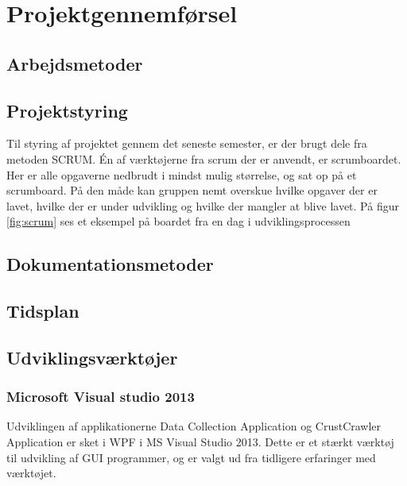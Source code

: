 \thispagestyle{fancy}
\chapter{Projektgennemførsel}
\label{chp:projektgennemforsel}

\section{Arbejdsmetoder}
\label{sec:arbejdsmetoder}

\section{Projektstyring}
\label{sec:projektstyring}

Til styring af projektet gennem det seneste semester, er der brugt dele fra metoden SCRUM.
Én af værktøjerne fra scrum der er anvendt, er scrumboardet. Her er alle opgaverne nedbrudt i mindst mulig størrelse, og sat op på et scrumboard. På den måde kan gruppen nemt overskue hvilke opgaver der er lavet, hvilke der er under udvikling og hvilke der mangler at blive lavet. På figur \ref{fig:scrum} ses et eksempel på boardet fra en dag i udviklingsprocessen



\section{Dokumentationsmetoder}
\label{sec:dokumentationsmetoder}

\section{Tidsplan}
\label{sec:tidsplan}

\section{Udviklingsværktøjer}
\label{sec:Udviklingsvaerktojer}

\subsection*{Microsoft Visual studio 2013}
Udviklingen af applikationerne Data Collection Application og CrustCrawler Application er sket i WPF i MS Visual Studio 2013. Dette er et stærkt værktøj til udvikling af GUI programmer, og er valgt ud fra tidligere erfaringer med værktøjet.

